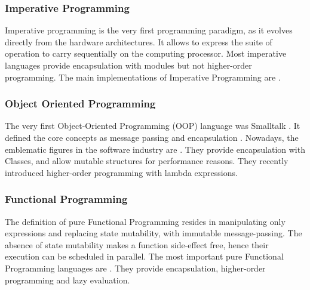 
\subsubsection{Imperative Programming}


Imperative programming is the very first programming paradigm, as it evolves directly from the hardware architectures.
It allows to express the suite of operation to carry sequentially on the computing processor.
Most imperative languages provide encapsulation with modules but not higher-order programming. %
The main implementations of Imperative Programming are .

\subsubsection{Object Oriented Programming}


The very first Object-Oriented Programming (OOP) language was Small\-talk \cite{Goldberg1984}.
It defined the core concepts as message passing and encapsulation %
.
Nowadays, the emblematic figures in the software industry are .
They provide encapsulation with Classes, and allow mutable structures for performance reasons.
They recently introduced higher-order programming with lambda expressions.

\subsubsection{Functional Programming} \label{chapter3:software-productivity:programming-models:functional-programming}


The definition of pure Functional Programming resides in manipulating only expressions and replacing state mutability, with immutable message-passing.
The absence of state mutability makes a function side-effect free, hence their execution can be scheduled in parallel.
The most important pure Functional Programming languages are .
They provide encapsulation, higher-order programming and lazy evaluation.

